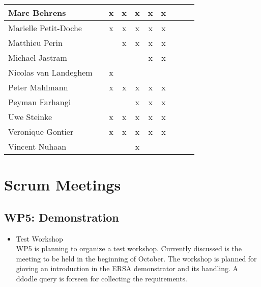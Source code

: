 \documentclass[a4paper, 11pt]{article}
\begin{document}
\begin{tabular}{|l|c|c|c||c|c|c||c|c|c|}
Marc Behrens         &   & x & x & x & x & x \\\hline
Marielle Petit-Doche &   & x & x & x & x & x \\\hline
Matthieu Perin       &   &   & x & x & x & x \\\hline
Michael Jastram      &   &   &   &   & x & x \\\hline
Nicolas van Landeghem&   & x &   &   &   &   \\\hline
Peter Mahlmann       &   & x & x & x & x & x \\\hline
Peyman Farhangi      &   &   &   & x & x & x \\\hline
Uwe Steinke          &   & x & x & x & x & x \\\hline
Veronique Gontier    &   & x & x & x & x & x \\\hline
Vincent Nuhaan       &   &   &   & x &   &   \\\hline
\end{tabular}


\section{Scrum Meetings}

\subsection{WP5: Demonstration}
\begin{itemize}
\item Test Workshop\\
WP5 is planning to organize a test workshop. Currently discussed is the meeting to be held in the beginning of October. The workshop is planned for gioving an introduction in the ERSA demonstrator and its handling. A ddodle query is forseen for collecting the requirements.

\end{itemize}
\end{document}
